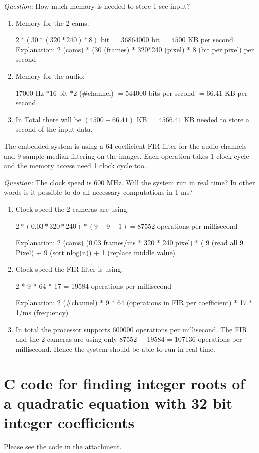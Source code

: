 \documentclass[a4paper,10pt]{scrartcl}
\begin{document}
\textit{Question:} How much memory is needed to store 1 sec input?
\begin{enumerate}
\item Memory for the 2 cams:

$2 * (30 * (320*240) * 8)$ bit $ =  36864000$ bit $= 4500$  KB per second \newline
Explanation: 2 (cams) * (30 (frames) * 320*240 (pixel) * 8 (bit per pixel) per second

\item Memory for the audio:

$ 17000$ Hz $* 16$ bit $* 2$ (\#channel) $= 544000$ bits per second $=  66.41$ KB per second \newline

\item In Total there will be $(4500 + 66.41)$ KB $= 4566.41$ KB needed to store a second of the input data.
\end{enumerate}

The embedded system is using a 64 coefficient FIR filter for the audio channels and 9 sample median filtering on the images. Each operation takes 1 clock cycle and the memory access need 1 clock cycle too. 


\textit{Question:} The clock speed is 600 MHz. Will the system run in real time? In other words is it possible to do all necessary computations in 1 ms?

\begin{enumerate}
\item Clock speed the 2 cameras are using:

$ 2* (0.03 * 320 * 240) * ( 9 + 9 + 1) = 87552 $ operations per millisecond

Explanation: 2 (cams) (0.03 frames/ms * 320 * 240 pixel) * ( 9 (read all 9 Pixel) + 9 (sort nlog(n)) + 1 (replace middle value) 

\item Clock speed the FIR filter is using:

2 * 9 * 64 * 17 = 19584 operations per millisecond

Explanation: 2 (\#channel) * 9 * 64  (operations in FIR per coefficient) * 17 * 1/ms (frequency)

\item In total the processor supports 600000 operations per millisecond. The FIR and the 2 cameras are using only 87552 + 19584 = 107136 operations per millisecond. Hence the system should be able to run in real time.
\end{enumerate}


\section{C code for finding integer roots of a quadratic equation with 32 bit integer coefficients}
Please see the code in the attachment.
\end{document}
